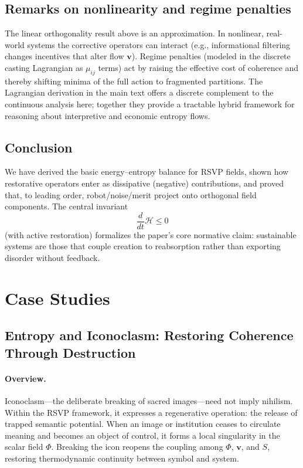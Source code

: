 \documentclass[12pt]{article}
\begin{document}
\subsection{Remarks on nonlinearity and regime penalties}
The linear orthogonality result above is an approximation. In nonlinear, real-world systems the corrective operators can interact (e.g., informational filtering changes incentives that alter flow $\mathbf v$). Regime penalties (modeled in the discrete casting Lagrangian as $\mu_{ij}$ terms) act by raising the effective cost of coherence and thereby shifting minima of the full action to fragmented partitions. The Lagrangian derivation in the main text offers a discrete complement to the continuous analysis here; together they provide a tractable hybrid framework for reasoning about interpretive and economic entropy flows.

\subsection{Conclusion}
We have derived the basic energy–entropy balance for RSVP fields, shown how restorative operators enter as dissipative (negative) contributions, and proved that, to leading order, robot/noise/merit project onto orthogonal field components. The central invariant
\[
\frac{d}{dt}\mathcal H \le 0
\]
(with active restoration) formalizes the paper’s core normative claim: sustainable systems are those that couple creation to reabsorption rather than exporting disorder without feedback.


\section{Case Studies}
\subsection{Entropy and Iconoclasm: Restoring Coherence Through Destruction}
\label{sec:entropy-iconoclasm}

\paragraph{Overview.}
Iconoclasm—the deliberate breaking of sacred images—need not imply nihilism.  
Within the RSVP framework, it expresses a regenerative operation: the release of trapped semantic potential.  
When an image or institution ceases to circulate meaning and becomes an object of control, it forms a local singularity in the scalar field $\Phi$.  
Breaking the icon reopens the coupling among $\Phi$, $\mathbf v$, and $S$, restoring thermodynamic continuity between symbol and system.
\end{document}
